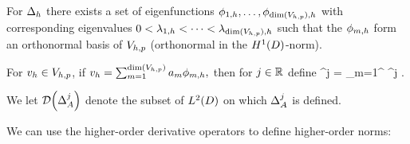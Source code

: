 For $\Delta_{h}$ there exists a set of eigenfunctions $\phioh,\ldots,\phidimVhph$  with corresponding eigenvalues $0 < \lambdaoh < \cdots < \lambdadimVhph$ such that the $\phi_{m,h}$ form an orthonormal basis of $V_{h,p}$ (orthonormal in the $\HoD$-norm).

For $v_{h} \in V_{h,p}$, if $\vh = \sum_{m=1}^{\dimVhp} \am \phimh,$ then for $j \in \mathbb R$ define
\beqs
\Deltah^j \vh = \sum_{m=1}^{\dimVhp} \lambdamh^j \am \phimh.
\eeqs

\ede

We let $\Domain{\DeltaA^j}$ denote the subset of $\LtD$ on which $\Delta_{A}^j$ is defined.



We can use the higher-order derivative operators to define higher-order norms:




